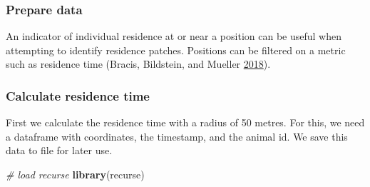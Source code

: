 \documentclass[]{scrartcl}
\newenvironment{Shaded}{}{}
\newcommand{\CommentTok}[1]{\textcolor[rgb]{0.38,0.63,0.69}{\textit{#1}}}
\newcommand{\DataTypeTok}[1]{\textcolor[rgb]{0.56,0.13,0.00}{#1}}
\newcommand{\DecValTok}[1]{\textcolor[rgb]{0.25,0.63,0.44}{#1}}
\newcommand{\ErrorTok}[1]{\textcolor[rgb]{1.00,0.00,0.00}{\textbf{#1}}}
\newcommand{\KeywordTok}[1]{\textcolor[rgb]{0.00,0.44,0.13}{\textbf{#1}}}
\newcommand{\NormalTok}[1]{#1}
\newcommand{\OperatorTok}[1]{\textcolor[rgb]{0.40,0.40,0.40}{#1}}
\newcommand{\StringTok}[1]{\textcolor[rgb]{0.25,0.44,0.63}{#1}}
\begin{document}
\hypertarget{prepare-data}{%
\subsubsection{Prepare data}\label{prepare-data}}

An indicator of individual residence at or near a position can be useful when attempting to identify residence patches. Positions can be filtered on a metric such as residence time (Bracis, Bildstein, and Mueller \protect\hyperlink{ref-bracis2018}{2018}).

\hypertarget{calculate-residence-time}{%
\subsubsection{Calculate residence time}\label{calculate-residence-time}}

First we calculate the residence time with a radius of 50 metres.
For this, we need a dataframe with coordinates, the timestamp, and the animal id.
We save this data to file for later use.

\begin{Shaded}
\begin{Highlighting}[]
\CommentTok{# load recurse}
\KeywordTok{library}\NormalTok{(recurse)}
\end{Highlighting}
\end{Shaded}

\begin{Shaded}
\end{Shaded}
\end{document}
